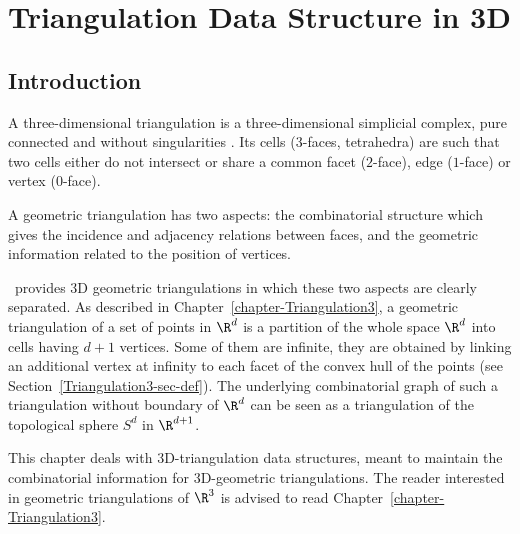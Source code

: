 \chapter{Triangulation Data Structure in 3D}
\label{chapter-TDS3}

\section{Introduction}
\label{TDS3-sec-intro}

A three-dimensional triangulation is a three-dimensional simplicial
complex, pure connected and without singularities \cite{by-ag-98}. Its
cells ($3$-faces, tetrahedra) are such that two cells either do not
intersect or share a common facet ($2$-face), edge ($1$-face) or
vertex ($0$-face).

A geometric triangulation has two aspects: the combinatorial structure which
gives the incidence and adjacency relations between faces, and the
geometric information related to the position of vertices.

\cgal\ provides 3D geometric triangulations in which these
two aspects are clearly separated.
As described in Chapter~\ref{chapter-Triangulation3}, a geometric
triangulation of a set of points in $\R^d$ is a partition of the
whole space $\R^d$ into cells having $d+1$ vertices. Some of them
are infinite, they are obtained by linking an additional vertex at
infinity to each facet of the convex hull of the points (see
Section~\ref{Triangulation3-sec-def}).  
The underlying combinatorial graph of such a triangulation
without boundary of $\R^d$ can be seen as a triangulation of the
topological sphere $S^d$ in $\R^{d+1}$. 

This chapter deals with 3D-triangulation data structures, meant to
maintain the combinatorial information for 3D-geometric
triangulations. The reader interested in geometric triangulations of
$\R^3$ is advised to read Chapter~\ref{chapter-Triangulation3}.

